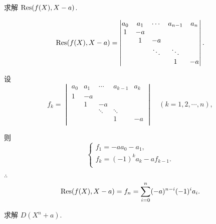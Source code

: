 \documentclass[color=black,device=normal,lang=cn,mode=geye]{elegantnote}
\begin{document}
\begin{exercise}\label{ex2.7}
    求解 $\operatorname{Res} (f(X),X-a)$.
\end{exercise}
\begin{solution}
    \[\operatorname{Res} (f(X),X-a)=\begin{vmatrix}
        a_0 & a_1 & \cdots & a_{n-1} & a_n \\
        1 & -a \\
        & 1 & -a \\
        && \ddots & \ddots \\
        &&& 1 & -a \\
    \end{vmatrix}.\]

    设
    \[f_k=\begin{vmatrix}
        a_0 & a_1 & \cdots & a_{k-1} & a_k \\
        1 & -a \\
        & 1 & -a \\
        && \ddots & \ddots \\
        &&& 1 & -a \\
    \end{vmatrix}\quad(k=1,2,\cdots,n),\]

    则
    \[\begin{cases}
        f_1=-aa_0-a_1, \\
        f_k=(-1)^ka_k-af_{k-1}. \\
    \end{cases}\]

    $\therefore$
    \[\operatorname{Res} (f(X),X-a)=f_n=\sum\limits_{i=0}^n(-a)^{n-i}(-1)^ia_i.\]
\end{solution}
\begin{exercise}\label{ex2.8}
    求解 $D(X^n+a)$.
\end{exercise}
\end{document}
